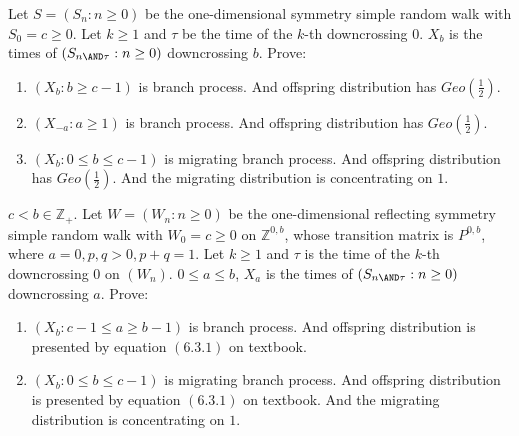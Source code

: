 \documentclass{ctexart}
\newif\ifpreface
\begin{document}
\large
\setlength{\baselineskip}{1.2em}
\ifpreface
  
\else
\fi
{}
\begin{problem}\label{pro:1}
  Let \(S=(S_n:n \geq 0)\) be the one-dimensional symmetry simple random walk with \(S_0=c \geq 0\).
  Let \(k \geq 1\) and \(\tau\) be the time of the \(k\)-th downcrossing \(0\).
  \(X_b\) is the times of \((S_{n \AND \tau}:n \geq 0)\) downcrossing \(b\). Prove:
  \begin{enumerate}
    \item \((X_b:b \geq c-1)\) is branch process. And offspring distribution has \(Geo(\frac{1}{2})\).
    \item \((X_{-a}:a \geq 1)\) is branch process. And offspring distribution has \(Geo(\frac{1}{2})\).
    \item \((X_b:0 \leq b \leq c-1)\) is migrating branch process. And offspring distribution has \(Geo(\frac{1}{2})\).
      And the migrating distribution is concentrating on \(1\).
  \end{enumerate}
\end{problem}
\begin{solution}
  
\end{solution}
\begin{problem}\label{pro:2}
  \(c < b \in \mathbb{Z}_+\). Let \(W=(W_n :n \geq 0)\) be the one-dimensional reflecting symmetry simple
  random walk with \(W_0=c \geq 0\) on \(\mathbb{Z}^{0,b}\), whose transition matrix is \(P^{0,b}\), where
  \(a = 0,p,q >0, p + q =1\).
  Let \(k \geq 1\) and \(\tau\) is the time of the \(k\)-th downcrossing \(0\) on \((W_n)\).
  \(0 \leq a \leq b\),
  \(X_a\) is the times of \((S_{n \AND \tau}:n \geq 0)\) downcrossing \(a\). Prove:
  \begin{enumerate}
    \item \((X_b:c-1 \leq a \geq b-1)\) is branch process. And offspring distribution is presented by equation \((6.3.1)\) on textbook.
    \item \((X_b:0 \leq b \leq c-1)\) is migrating branch process. And offspring distribution is presented by equation \((6.3.1)\) on textbook.
      And the migrating distribution is concentrating on \(1\).
  \end{enumerate}
\end{problem}
\end{document}
